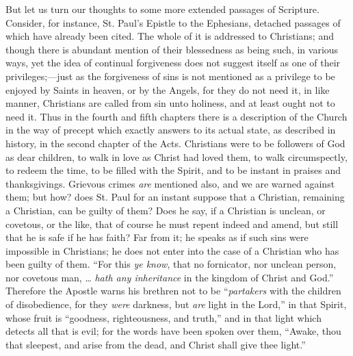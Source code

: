 But let us turn our thoughts to some more extended passages of
Scripture. Consider, for instance, St. Paul's Epistle to the Ephesians,
detached passages of which have already been cited. The whole of it is
addressed to Christians; and though there is abundant mention of their
blessedness as being such, in various ways, yet the idea of continual
forgiveness does not suggest itself as one of their privileges;—just
as the forgiveness of sins is not mentioned as a privilege to be
enjoyed by Saints in heaven, or by the Angels, for they do not need
it, in like manner, Christians are called from sin unto holiness, and
at least ought not to need it. Thus in the fourth and fifth chapters
there is a description of the Church in the way of precept which
exactly answers to its actual state, as described in history, in the
second chapter of the Acts. Christians were to be followers of God as
dear children, to walk in love as Christ had loved them, to walk
circumspectly, to redeem the time, to be filled with the Spirit, and
to be instant in praises and thanksgivings. Grievous crimes \emph{are}
mentioned also, and we are warned against them; but how? does St. Paul
for an instant suppose that a Christian, remaining a Christian, can be
guilty of them? Does he say, if a Christian is unclean, or covetous,
or the like, that of course he must repent indeed and amend, but still
that he is safe if he has faith? Far from it; he speaks as if such
sins were impossible in Christians; he does not enter into the case of
a Christian who has been guilty of them. ``For this \emph{ye know},
that no fornicator, nor unclean person, nor covetous man, … \emph{hath
any inheritance} in the kingdom of Christ and God.'' Therefore
the Apostle warns his brethren not to be ``\emph{partakers} with
the children of disobedience, for they \emph{were} darkness, but \emph{are}
light in the Lord,'' in that Spirit, whose fruit is ``goodness,
righteousness, and truth,'' and in that light which detects all
that is evil; for the words have been spoken over them, ``Awake,
thou that sleepest, and arise from the dead, and Christ shall give
thee light.''

